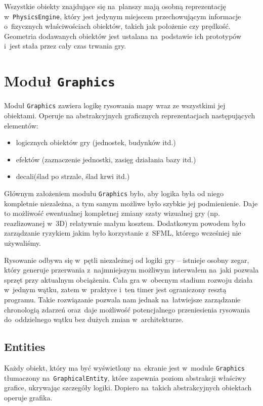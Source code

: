 \documentclass[licencjacka]{pracamgr}
\begin{document}
    Wszystkie obiekty znajdujące się na~planszy mają osobną reprezentację w~\texttt{PhysicsEngine}, który jest jedynym miejscem
    przechowującym informacje o~fizycznych właściwościach obiektów, takich jak położenie czy prędkość. Geometria dodawanych obiektów
    jest ustalana na~podstawie ich prototypów i~jest stała przez cały czas trwania gry.

  \section{Moduł \texttt{Graphics}}
    Moduł \texttt{Graphics} zawiera logikę rysowania mapy wraz ze wszystkimi jej obiektami. Operuje na
    abstrakcyjnych graficznych reprezentacjach następujących elementów:
    \begin{itemize}
     \item logicznych obiektów gry (jednostek, budynków itd.)
     \item efektów (zaznaczenie jednostki, zasięg działania bazy itd.)
     \item decali\protect\footnotemark (ślad po strzale, ślad krwi itd.)
    \end{itemize}

    Głównym założeniem modułu \texttt{Graphics} było, aby logika była od niego kompletnie niezależna, a tym samym możliwe
    było szybkie jej podmienienie. Daje to możliwość ewentualnej kompletnej zmiany szaty wizualnej gry (np. reazlizowanej w~3D)
    relatywnie małym kosztem. Dodatkowym powodem było zarządzanie ryzykiem jakim było korzystanie z~SFML, którego wcześniej
    nie używaliśmy.

    Rysowanie odbywa się w~pętli niezależnej od logiki gry -- istnieje osobny zegar, który generuje
    przerwania z~najmniejszym możliwym interwałem na~jaki pozwala sprzęt przy aktualnym obciążeniu. Cała gra w~obecnym
    stadium rozwoju działa w~jednym wątku, zatem w~praktyce i~ten timer jest ograniczony resztą programu. Takie
    rozwiązanie pozwala nam jednak na~łatwiejsze zarządzanie chronologią zdarzeń oraz~daje możliwość potencjalnego
    przeniesienia rysowania do~oddzielnego wątku bez dużych zmian w~architekturze.

    \subsection{Entities}
      Każdy obiekt, który ma być wyświetlony na~ekranie jest w~module \texttt{Graphics} tłumaczony na~\texttt{GraphicalEntity}, które
      zapewnia poziom abstrakcji właściwy grafice, ukrywając szczegóły logiki. Dopiero na~takich abstrakcyjnych obiektach operuje grafika.
\end{document}
